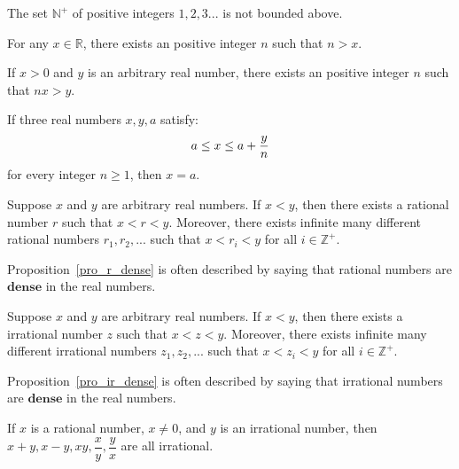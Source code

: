 	\begin{theoremenv}
		The set $\mathbb{N}^+$ of positive integers $1,2,3...$ is not bounded above.
	\end{theoremenv}
	\begin{theoremenv}
		For any $x\in \mathbb{R}$, there exists an positive integer $n$ such that $n>x$.
	\end{theoremenv}
	\begin{theoremenv}
		If $x>0$ and $y$ is an arbitrary real number, there exists an positive integer $n$ such that $nx>y$.
	\end{theoremenv}
	\begin{theoremenv}
		If three real numbers $x,y,a$ satisfy:
		\begin{equation}
			a\le x \le a+\frac{y}{n}\notag
		\end{equation}
		for every integer $n\ge 1$, then $x=a$.
	\end{theoremenv}
	\begin{propositionenv}\label{pro_r_dense}
		Suppose $x$ and $y$ are arbitrary real numbers. If $x<y$, then there exists a rational number $r$ such that $x<r<y$. Moreover, there exists infinite many different rational numbers $r_1,r_2,...$ such that $x<r_i<y$ for all $i\in \mathbb{Z}^+$.
	\end{propositionenv}
	\begin{remarkenv}
		Proposition~\ref{pro_r_dense} is often described by saying that rational numbers are $\mathbf{dense}$ in the real numbers.
	\end{remarkenv}
	\begin{propositionenv}\label{pro_ir_dense}
		Suppose $x$ and $y$ are arbitrary real numbers. If $x<y$, then there exists a irrational number $z$ such that $x<z<y$. Moreover, there exists infinite many different irrational numbers $z_1,z_2,...$ such that $x<z_i<y$ for all $i\in \mathbb{Z}^+$.
	\end{propositionenv}
	\begin{remarkenv}
		Proposition~\ref{pro_ir_dense} is often described by saying that irrational numbers are $\mathbf{dense}$ in the real numbers.
	\end{remarkenv}
	\begin{propositionenv}
		If $x$ is a rational number, $x\neq 0$, and $y$ is an irrational number, then $x+y,x-y,xy,\dfrac{x}{y},\dfrac{y}{x}$ are all irrational.
	\end{propositionenv}
